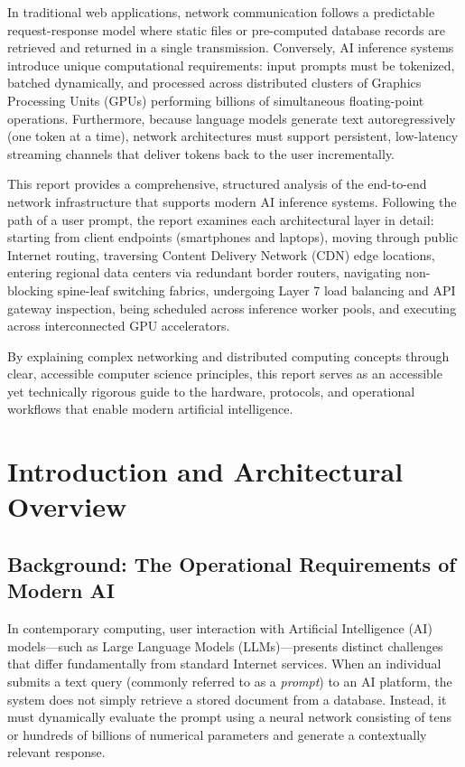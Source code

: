\documentclass[12pt,a4paper]{report}
\begin{document}
In traditional web applications, network communication follows a predictable request-response model where static files or pre-computed database records are retrieved and returned in a single transmission. Conversely, AI inference systems introduce unique computational requirements: input prompts must be tokenized, batched dynamically, and processed across distributed clusters of Graphics Processing Units (GPUs) performing billions of simultaneous floating-point operations. Furthermore, because language models generate text autoregressively (one token at a time), network architectures must support persistent, low-latency streaming channels that deliver tokens back to the user incrementally.

This report provides a comprehensive, structured analysis of the end-to-end network infrastructure that supports modern AI inference systems. Following the path of a user prompt, the report examines each architectural layer in detail: starting from client endpoints (smartphones and laptops), moving through public Internet routing, traversing Content Delivery Network (CDN) edge locations, entering regional data centers via redundant border routers, navigating non-blocking spine-leaf switching fabrics, undergoing Layer 7 load balancing and API gateway inspection, being scheduled across inference worker pools, and executing across interconnected GPU accelerators.

By explaining complex networking and distributed computing concepts through clear, accessible computer science principles, this report serves as an accessible yet technically rigorous guide to the hardware, protocols, and operational workflows that enable modern artificial intelligence.

\clearpage

\tableofcontents
{}

\clearpage
\listoffigures
{}

\clearpage


\chapter{Introduction and Architectural Overview}

\section{Background: The Operational Requirements of Modern AI}
In contemporary computing, user interaction with Artificial Intelligence (AI) models—such as Large Language Models (LLMs)—presents distinct challenges that differ fundamentally from standard Internet services. When an individual submits a text query (commonly referred to as a \textit{prompt}) to an AI platform, the system does not simply retrieve a stored document from a database. Instead, it must dynamically evaluate the prompt using a neural network consisting of tens or hundreds of billions of numerical parameters and generate a contextually relevant response.
\end{document}
